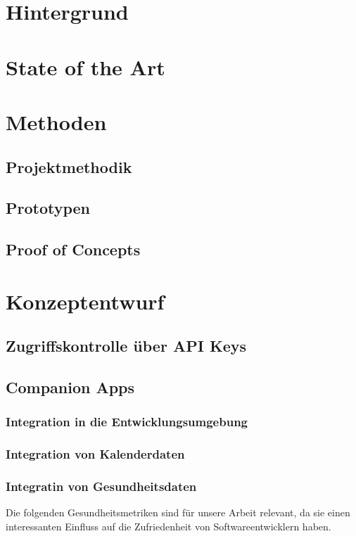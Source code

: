 \documentclass[12pt,a4paper]{report}
\begin{document}
\chapter{Hintergrund}
\chapter{State of the Art}

\chapter{Methoden}
\section{Projektmethodik}
\section{Prototypen}
\section{Proof of Concepts}

\chapter{Konzeptentwurf}
\section{Zugriffskontrolle über API Keys}
\section{Companion Apps}
\subsection{Integration in die Entwicklungsumgebung}
\subsection{Integration von Kalenderdaten}
\subsection{Integratin von Gesundheitsdaten}

Die folgenden Gesundheitsmetriken sind für unsere Arbeit relevant, da sie einen interessanten Einfluss
auf die Zufriedenheit von Softwareentwicklern haben.
\end{document}
